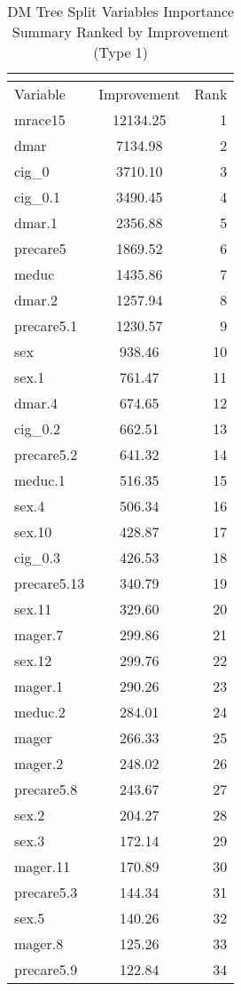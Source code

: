 \begingroup\small\setlength{\tabcolsep}{0.5em}\renewcommand{\arraystretch}{0.9}
\begin{longtable}{lcr}
\caption{DM Tree Split Variables Importance Summary Ranked by Improvement (Type 1)}\\
\label{tab:var_imp_summary_type1_multipage}\\
\hline
Variable & Improvement & Rank \\ \hline
\endhead
mrace15 & 12134.25 & 1 \\
dmar & 7134.98 & 2 \\
cig_0 & 3710.10 & 3 \\
cig_0.1 & 3490.45 & 4 \\
dmar.1 & 2356.88 & 5 \\
precare5 & 1869.52 & 6 \\
meduc & 1435.86 & 7 \\
dmar.2 & 1257.94 & 8 \\
precare5.1 & 1230.57 & 9 \\
sex & 938.46 & 10 \\
sex.1 & 761.47 & 11 \\
dmar.4 & 674.65 & 12 \\
cig_0.2 & 662.51 & 13 \\
precare5.2 & 641.32 & 14 \\
meduc.1 & 516.35 & 15 \\
sex.4 & 506.34 & 16 \\
sex.10 & 428.87 & 17 \\
cig_0.3 & 426.53 & 18 \\
precare5.13 & 340.79 & 19 \\
sex.11 & 329.60 & 20 \\
mager.7 & 299.86 & 21 \\
sex.12 & 299.76 & 22 \\
mager.1 & 290.26 & 23 \\
meduc.2 & 284.01 & 24 \\
mager & 266.33 & 25 \\
mager.2 & 248.02 & 26 \\
precare5.8 & 243.67 & 27 \\
sex.2 & 204.27 & 28 \\
sex.3 & 172.14 & 29 \\
mager.11 & 170.89 & 30 \\
precare5.3 & 144.34 & 31 \\
sex.5 & 140.26 & 32 \\
mager.8 & 125.26 & 33 \\
precare5.9 & 122.84 & 34 \\

\end{longtable}
